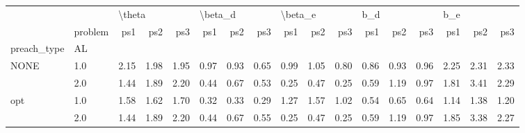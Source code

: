 \begin{tabular}{llrrrrrrrrrrrrrrr}
\toprule
    & {} & \multicolumn{3}{l}{\textbackslash theta} & \multicolumn{3}{l}{\textbackslash beta\_d} & \multicolumn{3}{l}{\textbackslash beta\_e} & \multicolumn{3}{l}{b\_d} & \multicolumn{3}{l}{b\_e} \\
    & problem &    ps1 &  ps2 &  ps3 &     ps1 &  ps2 &  ps3 &     ps1 &  ps2 &  ps3 &  ps1 &  ps2 &  ps3 &  ps1 &  ps2 &  ps3 \\
preach\_type & AL &        &      &      &         &      &      &         &      &      &      &      &      &      &      &      \\
\midrule
NONE & 1.0 &   2.15 & 1.98 & 1.95 &    0.97 & 0.93 & 0.65 &    0.99 & 1.05 & 0.80 & 0.86 & 0.93 & 0.96 & 2.25 & 2.31 & 2.33 \\
    & 2.0 &   1.44 & 1.89 & 2.20 &    0.44 & 0.67 & 0.53 &    0.25 & 0.47 & 0.25 & 0.59 & 1.19 & 0.97 & 1.81 & 3.41 & 2.29 \\
opt & 1.0 &   1.58 & 1.62 & 1.70 &    0.32 & 0.33 & 0.29 &    1.27 & 1.57 & 1.02 & 0.54 & 0.65 & 0.64 & 1.14 & 1.38 & 1.20 \\
    & 2.0 &   1.44 & 1.89 & 2.20 &    0.44 & 0.67 & 0.55 &    0.25 & 0.47 & 0.25 & 0.59 & 1.19 & 0.97 & 1.85 & 3.38 & 2.27 \\
\bottomrule
\end{tabular}
